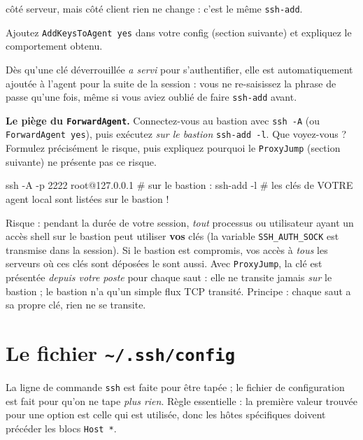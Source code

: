 \documentclass[a4paper,10pt]{exam}
\begin{document}
\begin{questions}
\begin{solution}
côté serveur, mais côté client rien ne change : c'est le même \texttt{ssh-add}.
\end{solution}
\question Ajoutez \texttt{AddKeysToAgent yes} dans votre config (section suivante) et expliquez
le comportement obtenu.
\begin{solution}
Dès qu'une clé déverrouillée \emph{a servi} pour s'authentifier, elle est automatiquement
ajoutée à l'agent pour la suite de la session : vous ne re-saisissez la phrase de passe
qu'une fois, même si vous aviez oublié de faire \texttt{ssh-add} avant.
\end{solution}
\question \textbf{Le piège du \texttt{ForwardAgent}.} Connectez-vous au bastion avec
\texttt{ssh -A} (ou \texttt{ForwardAgent yes}), puis exécutez \emph{sur le bastion}
\texttt{ssh-add -l}. Que voyez-vous ? Formulez précisément le risque, puis expliquez
pourquoi le \texttt{ProxyJump} (section suivante) ne présente pas ce risque.
\begin{solution}
\begin{bashcode}
ssh -A -p 2222 root@127.0.0.1
# sur le bastion :
ssh-add -l
# les clés de VOTRE agent local sont listées sur le bastion !
\end{bashcode}
Risque : pendant la durée de votre session, \emph{tout} processus ou utilisateur ayant un
accès shell sur le bastion peut utiliser \textbf{vos} clés (la variable \texttt{SSH\_AUTH\_SOCK}
est transmise dans la session). Si le bastion est compromis, vos accès à \emph{tous} les
serveurs où ces clés sont déposées le sont aussi.
Avec \texttt{ProxyJump}, la clé est présentée \emph{depuis votre poste} pour chaque saut :
elle ne transite jamais \emph{sur} le bastion ; le bastion n'a qu'un simple flux TCP
transité. Principe : chaque saut a sa propre clé, rien ne se transite.
\end{solution}
\end{questions}

\section{Le fichier \texttt{\textasciitilde/.ssh/config}}

La ligne de commande \texttt{ssh} est faite pour être tapée ; le fichier de configuration est
fait pour qu'on ne tape \emph{plus rien}. Règle essentielle : la première valeur trouvée
pour une option est celle qui est utilisée, donc les hôtes spécifiques doivent précéder les
blocs \texttt{Host *}.
\end{document}
